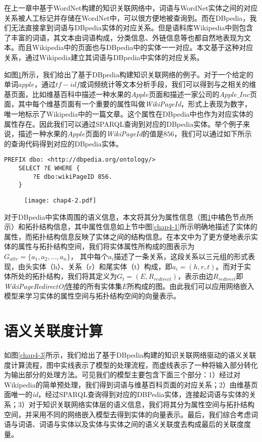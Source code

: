 在上一章中基于WordNet构建的知识关联网络中，词语与WordNet实体之间的对应关系被人工标记并存储在WordNet中，可以很方便地被查询到。而在DBpedia，我们无法直接拿到词语与DBpedia实体的对应关系。但是语料库Wikipedia中则包含了丰富的词语，其文本由词语构成，分类信息、外链信息等也都自然地表现为文本。而且Wikipedia中的页面也与DBpedia中的实体一一对应。本文基于这种对应关系，通过Wikipedia建立其词语与DBpedia中实体的对应关系。

如图\ref{chap4-2}所示，我们给出了基于DBpedia构建知识关联网络的例子。对于一个给定的单词$apple$，通过$tf-idf$或词频统计等文本分析手段，我们可以得到与之相关的维基页面，比如维基百科中描述一种水果的$Apple$页面和描述一家公司的$Apple\_Inc$页面，其中每个维基页面有一个重要的属性叫做\emph{WikiPageId}，形式上表现为数字，唯一地标示了Wikipedia中的一篇文章。这个属性在DBpedia中也作为对应实体的属性存在。因此我们可以通过SPARQL查询到对应的DBpedia实体。举个例子来说，描述一种水果的$Apple$页面的\emph{WikiPageId}的值是$856$，我们可以通过如下所示的查询代码得到对应的DBpedia实体。

\begin{lstlisting}[basicstyle=\fontsize{10}{11}\ttfamily,aboveskip=1em,frame=shadowbox]
    PREFIX dbo: <http://dbpedia.org/ontology/>
    SELECT ?E WHERE {
        ?E dbo:wikiPageID 856.
    }
\end{lstlisting}

\begin{figure}[!ht]
    \centerline{\texttt{[image: chap4-2.pdf]}}
    \label{chap4-2}
\end{figure}

对于DBpedia中实体周围的语义信息，本文将其分为属性信息（图\ref{chap4-2}中橘色节点所示）和拓扑结构信息，其中属性信息如上节中图\ref{chap4-1}所示明确地描述了实体的属性，而拓扑结构信息反映了实体之间的结构信息。在本文中为了更方便地表示实体的属性与拓扑结构空间，我们将实体属性所构成的图表示为$G_{attr} = \{a_1, a_2, ..., a_n\}$， 其中每个$a_i$描述了一条关系，这段关系以三元组的形式表现，由头实体（h）、关系（r）和尾实体（t）构成，即$a_i = (h, r, t)$。而对于实体所处的拓扑结构，我们将其定义为$G_{t} = (E, R_{redirect})$，表示由边$R_{redirect}$即\emph{WikiPageRedirectOf}连接的所有实体集$E$所构成的图。由此我们可以应用网络嵌入模型来学习实体的属性空间与拓扑结构空间的向量表示。

\section{语义关联度计算}
如图\ref{chap4-3}所示，我们给出了基于DBpedia构建的知识关联网络驱动的语义关联度计算流程，图中实线表示了模型的处理流程，而虚线表示了一种将输入部分转化为输出部分的处理方法。可见我们的模型主要包含下面三个部分：1）经过对Wikipedia的简单预处理，我们得到词语与维基百科页面的对应关系；2）由维基页面唯一的\emph{id}，经过SPARQL查询得到对应的DBPedia实体，连接起词语与实体的关系；3）对于知识关联网络实体层的语义信息，我们将其分为属性空间与拓扑结构空间，并采用不同的网络嵌入模型去得到实体的向量表示。最后，我们综合考虑词语与词语、词语与实体以及实体与实体之间的语义关联度去构成最后的关联度度量。

